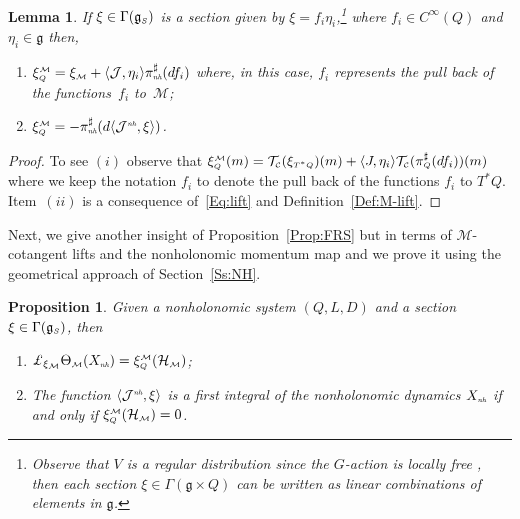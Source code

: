 \documentclass[pdftex]{sigma}
\numberwithin{equation}{section}
\newtheorem{Lemma}[Theorem]{Lemma}
\newtheorem{Proposition}[Theorem]{Proposition}
 { \theoremstyle{definition}
\newtheorem{Definition}[Theorem]{Definition}
\newtheorem{Example}[Theorem]{Example}
\newtheorem{Remark}[Theorem]{Remark}
\newtheorem{Remarks}[Theorem]{Remarks} }
\def\M{\mathcal{M}}
\def\J{\mathcal{J}}
\def\C{\mathcal{C}}
\def\Ham{\mathcal{H}}
\def\g{\mathfrak{g}}
\def\nh{{\mbox{\tiny{nh}}}}
\def\subC{{\mbox{\tiny{$\C$}}}}
\def\subM{{\mbox{\tiny{$\M$}}}}
\def\subSS{{\mbox{\tiny{$S$}}}}
\def\subQQ{{\mbox{\tiny{$Q$}}}}
\begin{document}
\begin{Lemma}\label{L:C-lift}
If $\xi\in\Gamma(\g_\subSS)$ is a section given by $\xi= f_i   \eta_i$,\footnote{Observe that $V$ is a regular distribution since the $G$-action is locally free \cite{Ortega-Ratiu}, then each section $\xi\in \Gamma(\g\times Q)$ can be written as linear combinations of elements in $\g$.} where $f_i \in C^\infty(Q)$ and $\eta_i \in \g$ then,
\begin{enumerate}\itemsep=0pt
 \item[$(i)$] $\xi_\subQQ^\subM = \xi_{\subM}  + \langle \J,\eta_i\rangle   \pi_{\emph\nh}^\sharp(df_i) $ where, in this case, $f_i$ represents the pull back of the func\-tions~$f_i$ to~$\M$;
 \item[$(ii)$] $\xi_\subQQ^\subM  = - \pi_{\emph\nh}^\sharp(d\langle \J^{\emph\nh}, \xi\rangle)$.
\end{enumerate}
\end{Lemma}

\begin{proof} To see $(i)$ observe that $\xi_\subQQ^\subM (m) = {\mathcal T}_\subC(\xi_{\mbox{\tiny{$T^*Q$}}} )(m)   + \langle J,\eta_i\rangle {\mathcal T}_\subC (\pi^\sharp_{\mbox{\tiny{$Q$}}}(df_i) )(m) $ where we keep the notation $f_i$ to denote the pull back of the functions $f_i$ to $T^*Q$.  Item~$(ii)$ is a consequence of~\eqref{Eq:lift} and Def\/inition~\ref{Def:M-lift}.
\end{proof}

Next, we give another insight of Proposition~\ref{Prop:FRS} but in terms of
$\M$-cotangent lifts and the nonholonomic momentum map and we prove
it using the geometrical approach of Section~\ref{Ss:NH}.

\begin{Proposition}\label{Prop:3Conditions}
 Given a nonholonomic system $(Q,L,D)$ and a section $\xi\in \Gamma(\g_\subSS)$, then
 \begin{enumerate}\itemsep=0pt
  \item[$(i)$]  $\pounds_{\xi_\M} \Theta_\subM (X_{\emph\nh})  = \xi_{\mbox{\tiny{$Q$}}}^\subM (\Ham_\subM)$;
 \item[$(ii)$] The function $\langle{\mathcal J}^{\emph\nh}, \xi\rangle$
 is a first integral of the nonholonomic dynamics $X_{\emph\nh}$
 if and only if $\xi_{\mbox{\tiny{$Q$}}}^\subM (\Ham_\subM) = 0$.
 \end{enumerate}
\end{Proposition}
\end{document}
